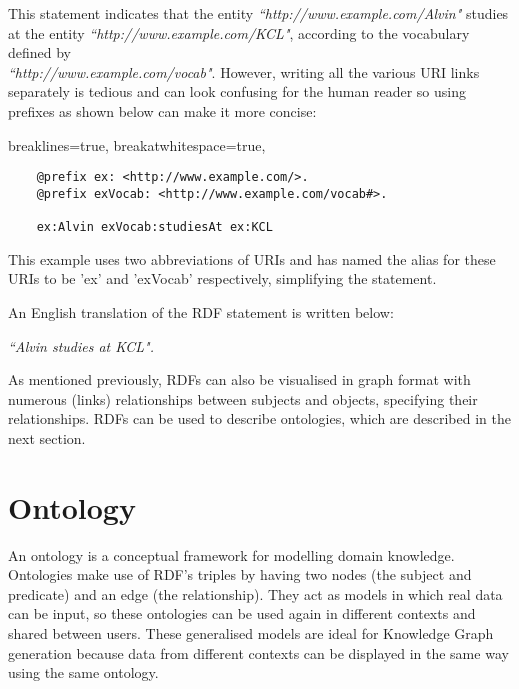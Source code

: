 This statement indicates that the entity \textit{``http://www.example.com/Alvin"} studies at the entity \textit{``http://www.example.com/KCL"}, according to the vocabulary defined by \\\textit{``http://www.example.com/vocab"}. However, writing all the various URI links separately is tedious and can look confusing for the human reader so using prefixes as shown below can make it more concise:

\vspace{-0.2cm}
\lstset
{
    breaklines=true,
    breakatwhitespace=true,
}
\begin{center}
\begin{lstlisting}
    @prefix ex: <http://www.example.com/>. 
    @prefix exVocab: <http://www.example.com/vocab#>. 

    ex:Alvin exVocab:studiesAt ex:KCL
\end{lstlisting}
\end{center} 
\vspace{-0.2cm}

This example uses two abbreviations of URIs and has named the alias for these URIs to be 'ex' and 'exVocab' respectively, simplifying the statement. 

An English translation of the RDF statement is written below: 

\vspace{-0.1cm}
\begin{center}
    \textit{``Alvin studies at KCL". }
\end{center}
\vspace{-0.1cm}

As mentioned previously, RDFs can also be visualised in graph format with numerous (links) relationships between subjects and objects, specifying their relationships. RDFs can be used to describe ontologies, which are described in the next section.

\section{Ontology}
\hspace{0.5cm} An ontology is a conceptual framework for modelling domain knowledge. \cite{ontology} Ontologies make use of RDF's triples by having two nodes (the subject and predicate) and an edge (the relationship). They act as models in which real data can be input, so these ontologies can be used again in different contexts and shared between users. These generalised models are ideal for Knowledge Graph generation because data from different contexts can be displayed in the same way using the same ontology. 

